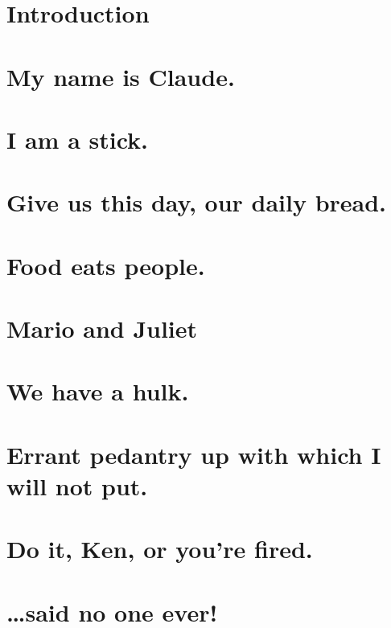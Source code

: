 

\chapter{Introduction} %

\chapter{My name is Claude.} %

\chapter{I am a stick.} %

\chapter{Give us this day, our daily bread.} %

\chapter{Food eats people.} %

\chapter{Mario and Juliet} %

\chapter{We have a hulk.} %

\chapter{Errant pedantry up with which I will not put.} %

\chapter{Do it, Ken, or you're fired.} %

\chapter{\ldots{}said no one ever!} %

